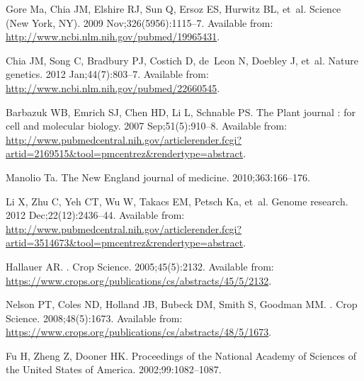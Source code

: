 \documentclass[10pt,letterpaper]{article}
\begin{document}
\begin{thebibliography}{10}
Gore Ma, Chia JM, Elshire RJ, Sun Q, Ersoz ES, Hurwitz BL, et~al.
\newblock Science (New York, NY). 2009 Nov;326(5956):1115--7.
\newblock Available from: \url{http://www.ncbi.nlm.nih.gov/pubmed/19965431}.

Chia JM, Song C, Bradbury PJ, Costich D, de~Leon N, Doebley J, et~al.
\newblock Nature genetics. 2012 Jan;44(7):803--7.
\newblock Available from: \url{http://www.ncbi.nlm.nih.gov/pubmed/22660545}.

Barbazuk WB, Emrich SJ, Chen HD, Li L, Schnable PS.
\newblock The Plant journal : for cell and molecular biology. 2007
  Sep;51(5):910--8.
\newblock Available from:
  \url{http://www.pubmedcentral.nih.gov/articlerender.fcgi?artid=2169515\&tool=pmcentrez\&rendertype=abstract}.

Manolio Ta.
\newblock The New England journal of medicine. 2010;363:166--176.

Li X, Zhu C, Yeh CT, Wu W, Takacs EM, Petsch Ka, et~al.
\newblock Genome research. 2012 Dec;22(12):2436--44.
\newblock Available from:
  \url{http://www.pubmedcentral.nih.gov/articlerender.fcgi?artid=3514673\&tool=pmcentrez\&rendertype=abstract}.

Hallauer AR.
.
\newblock Crop Science. 2005;45(5):2132.
\newblock Available from:
  \url{https://www.crops.org/publications/cs/abstracts/45/5/2132}.

Nelson PT, Coles ND, Holland JB, Bubeck DM, Smith S, Goodman MM.
.
\newblock Crop Science. 2008;48(5):1673.
\newblock Available from:
  \url{https://www.crops.org/publications/cs/abstracts/48/5/1673}.

Fu H, Zheng Z, Dooner HK.
\newblock Proceedings of the National Academy of Sciences of the United States
  of America. 2002;99:1082--1087.


\end{thebibliography}
\end{document}
